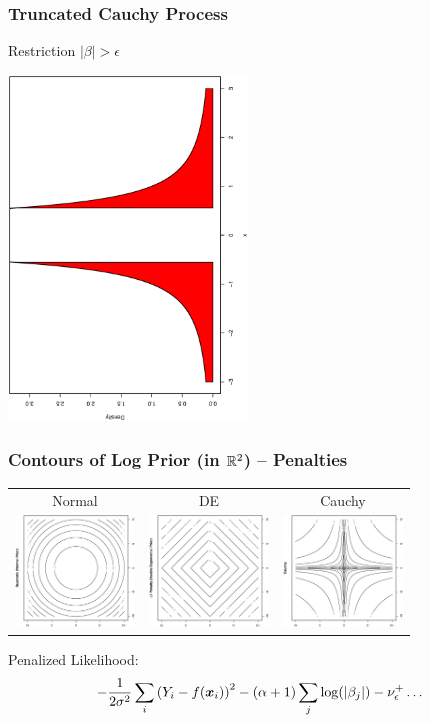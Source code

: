 \documentclass[]{beamer}
\newcommand{\bs}[2]{\begin{frame} \frametitle{#1}
{#2}
\end{frame} }
\begin{document}
\bs{Truncated Cauchy Process} {
\centerline{Restriction  $|\beta| > \epsilon$}

\centerline{\includegraphics[width=2.5in,angle=270]{cauchy1.ps}}
}


\bs{Contours of Log Prior (in $\mathbb{R}^2$) -- Penalties} {
\begin{tabular}{ccc}
Normal  & DE  & Cauchy \\
\includegraphics[angle=270,width=1.25in]{L2.ps} &
\includegraphics[angle=270,width=1.25in]{L1.ps} &
\includegraphics[angle=270,width=1.25in]{cauchy.ps}
\end{tabular}

\vspace{.25in}
Penalized Likelihood:
$$-\frac{1}{2 \sigma^2} \sum_i\left(Y_i - f(\bm x_i)\right)^2  - (\alpha +
1) \sum_j
\log(|\beta_j|)  - \nu^+_{\epsilon} \ldots $$

}
\end{document}
